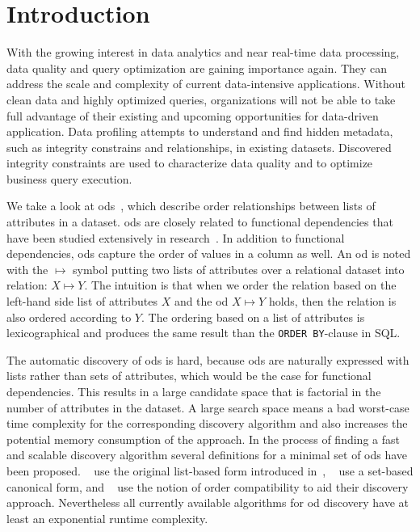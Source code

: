 
\section{Introduction}\label{sec:intro}

  With the growing interest in data analytics and near real-time data processing, data quality and query optimization are gaining importance again.
  They can address the scale and complexity of current data-intensive applications.
  Without clean data and highly optimized queries, organizations will not be able to take full advantage of their existing and upcoming opportunities for data-driven application.
  Data profiling attempts to understand and find hidden metadata, such as integrity constrains and relationships, in existing datasets.
  Discovered integrity constraints are used to characterize data quality and to optimize business query execution.

  We take a look at \glspl{od}~\cite{ginsburg,szlichta:fundamentals}, which describe order relationships between lists of attributes in a dataset.
  \glspl{od} are closely related to functional dependencies that have been studied extensively in research~\cite{dependencies:review}.
  In addition to functional dependencies, \glspl{od} capture the order of values in a column as well.
  An \gls{od} is noted with the $\mapsto$ symbol putting two lists of attributes over a relational dataset into relation: $X \mapsto Y$.
  The intuition is that when we order the relation based on the left-hand side list of attributes $X$ and the \gls{od} $X \mapsto Y$ holds, then the relation is also ordered according to $Y$.
  The ordering based on a list of attributes is lexicographical and produces the same result than the \texttt{ORDER BY}-clause in SQL.

  The automatic discovery of \glspl{od} is hard, because \glspl{od} are naturally expressed with lists rather than sets of attributes, which would be the case for functional dependencies.
  This results in a large candidate space that is factorial in the number of attributes in the dataset.
  A large search space means a bad worst-case time complexity for the corresponding discovery algorithm and also increases the potential memory consumption of the approach.
  In the process of finding a fast and scalable discovery algorithm several definitions for a minimal set of \glspl{od} have been proposed.
  ~\cite{langer} use the original list-based form introduced in~\cite{szlichta:fundamentals}, \citeauthor{szlichta:discovery}~\cite{szlichta:discovery} use a set-based canonical form, and \citeauthor{consonni}~\cite{consonni} use the notion of order compatibility to aid their discovery approach.
  Nevertheless all currently available algorithms for \gls{od} discovery have at least an exponential runtime complexity.

